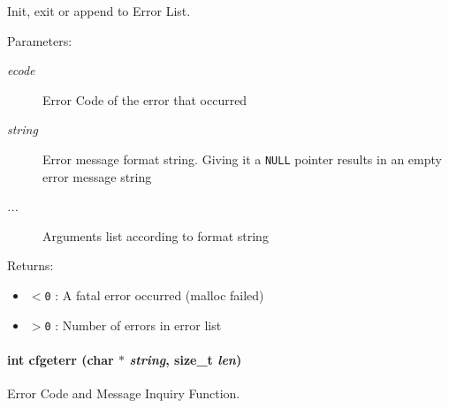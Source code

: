 Init, exit or append to Error List. 

\begin{Desc}
\item[Parameters:]
\begin{description}
\item[{\em ecode}]Error Code of the error that occurred\item[{\em string}]Error message format string. Giving it a {\tt NULL} pointer results in an empty error message string\item[{\em ...}]Arguments list according to format string\end{description}
\end{Desc}
\begin{Desc}
\item[Returns:]\begin{itemize}
\item {\tt $<$0} : A fatal error occurred (malloc failed) \item {\tt $>$0} : Number of errors in error list \end{itemize}
\end{Desc}
\hypertarget{group__errors_g2dc49b60b3ec7a82086e60f4b1c41e18}{
\paragraph[{cfgeterr}]{\setlength{\rightskip}{0pt plus 5cm}int cfgeterr (char $\ast$ {\em string}, \/  size\_\-t {\em len})}\hfill}
\label{group__errors_g2dc49b60b3ec7a82086e60f4b1c41e18}


Error Code and Message Inquiry Function. 

